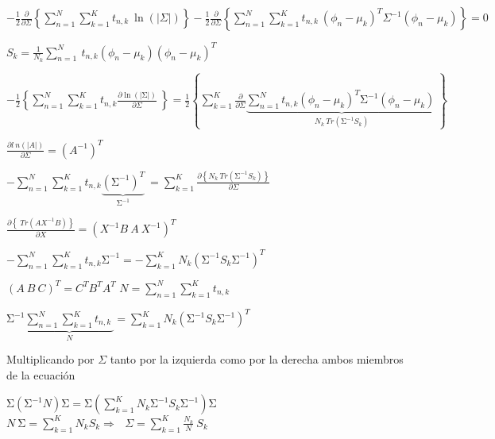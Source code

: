 \documentclass{article}
\begin{document}
$ \displaystyle
    -\frac{1}{2}\frac{\partial}{\partial\Sigma}\left\{\sum_{n=1}^{N}\sum_{k=1}^{K}{t_{n,k}\ \ln{\left(\left|\Sigma\right|\right)}}\right\}-\frac{1}{2}\frac{\partial}{\partial\Sigma}\left\{\sum_{n=1}^{N}\sum_{k=1}^{K}{t_{n,k}\ \left(\phi_n-\mu_k\right)^T\Sigma^{-1}\left(\phi_n-\mu_k\right)}\right\}=0
$

\begin{center}
    $ \displaystyle S_k=\frac{1}{N_k}\sum_{n=1}^{N}{\ t_{n,k}\left(\phi_n-\mu_k\right)\left(\phi_n-\mu_k\right)^T} $
\end{center}

$ \displaystyle
    -\frac{1}{2}\left\{\sum_{n=1}^{N}\sum_{k=1}^{K}{t_{n,k}\frac{\partial \ln {\left(\left|\mathrm{\Sigma}\right|\right)}}{\partial\Sigma}\ }\right\}=\frac{1}{2}
    \left\{
        \sum_{k=1}^{K}{
            \frac{\partial}{\partial\Sigma}{
                \underbrace{\sum_{n=1}^{N}{t_{n,k}\left(\phi_n-\mu_k\right)^T\mathrm{\Sigma}^{-1}\left(\phi_n-\mu_k\right)\ }}_{N_k\ Tr\left(\mathrm{\Sigma}^{-1}S_k\right)}}
        }
    \right\}
$

\begin{center}
    $\displaystyle \frac{\partial l\ n{\left(\left|A\right|\right)}}{\partial\Sigma}=\left(A^{-1}\right)^T $
\end{center}

$ \displaystyle
    -\sum_{n=1}^{N}{
        \sum_{k=1}^{K}{
            t_{n,k}{\underbrace{\left(\mathrm{\Sigma}^{-1}\right)^T}_{\mathrm{\Sigma}^{-1}}}\ 
        }
    }=\sum_{k=1}^{K}{
        \frac{\partial\left\{N_k\ Tr\left(\mathrm{\Sigma}^{-1}S_k\right)\right\}}{\partial\Sigma}
    }
$

\begin{center}
    $\displaystyle \frac{\partial\left\{\ Tr\left(AX^{-1}B\right)\right\}}{\partial X}=\left(X^{-1}B\ A\ X^{-1}\right)^T $
\end{center}

$\displaystyle
    -\sum_{n=1}^{N}\sum_{k=1}^{K}{t_{n,k}\mathrm{\Sigma}^{-1}}=-\sum_{k=1}^{K}N_k\left(\mathrm{\Sigma}^{-1}S_k\mathrm{\Sigma}^{-1}\right)^T
$

\begin{center}
    $\displaystyle \left(A\ B\ C\right)^T=C^TB^TA^T $
    $\displaystyle N=\sum_{n=1}^{N}\sum_{k=1}^{K}{t_{n,k}\ } $
\end{center}

$\displaystyle
    \mathrm{\Sigma}^{-1}\underbrace{
    \sum_{n=1}^{N}{
        \sum_{k=1}^{K}{
            t_{n,k}\ 
        }
    }
    }_N
     =\sum_{k=1}^{K}{
        N_k\left(\mathrm{\Sigma}^{-1}S_k\mathrm{\Sigma}^{-1}\right)^T
     }
$

\begin{center}
    Multiplicando por $\Sigma$ tanto por la izquierda como por la derecha ambos miembros de la ecuaci\'on
\end{center}

$\displaystyle
    \mathrm{\Sigma}\left(\mathrm{\Sigma}^{-1}N\right)\mathrm{\Sigma}=\mathrm{\Sigma}\left(\sum_{k=1}^{K}N_k\mathrm{\Sigma}^{-1}S_k\mathrm{\Sigma}^{-1}\right)\mathrm{\Sigma}
$
$\displaystyle
    N\ \mathrm{\Sigma}=\sum_{k=1}^{K}{N_kS_k}\Longrightarrow\ \ \ \Sigma=\sum_{k=1}^{K}{\frac{N_k}{N}\ S_k}
$
\end{document}
